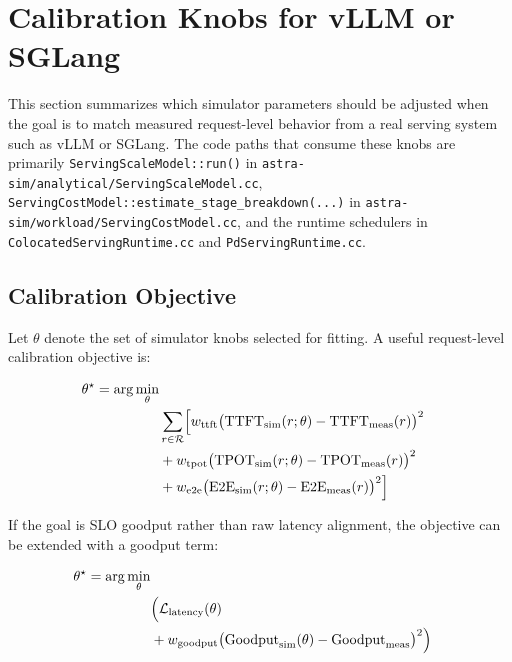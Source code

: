 \section{Calibration Knobs for vLLM or SGLang}

This section summarizes which simulator parameters should be adjusted when the
goal is to match measured request-level behavior from a real serving system such
as vLLM or SGLang. The code paths that consume these knobs are primarily
\texttt{ServingScaleModel::run()} in
\texttt{astra-sim/analytical/ServingScaleModel.cc},
\texttt{ServingCostModel::estimate\_stage\_breakdown(...)} in
\texttt{astra-sim/workload/ServingCostModel.cc}, and the runtime schedulers in
\texttt{ColocatedServingRuntime.cc} and \texttt{PdServingRuntime.cc}.

\subsection{Calibration Objective}

Let \(\theta\) denote the set of simulator knobs selected for fitting. A useful
request-level calibration objective is:

\begin{equation*}
\begin{aligned}
\theta^\star
= \arg\min_{\theta} \\
& \sum_{r \in \mathcal{R}}
\Bigl[
w_{\mathrm{ttft}}
\bigl(
\mathrm{TTFT}_{\mathrm{sim}}(r; \theta) -
\mathrm{TTFT}_{\mathrm{meas}}(r)
\bigr)^2 \\
& {}+ w_{\mathrm{tpot}}
\bigl(
\mathrm{TPOT}_{\mathrm{sim}}(r; \theta) -
\mathrm{TPOT}_{\mathrm{meas}}(r)
\bigr)^2 \\
& {}+ w_{\mathrm{e2e}}
\bigl(
\mathrm{E2E}_{\mathrm{sim}}(r; \theta) -
\mathrm{E2E}_{\mathrm{meas}}(r)
\bigr)^2
\Bigr]
\end{aligned}
\end{equation*}

If the goal is SLO goodput rather than raw latency alignment, the objective can
be extended with a goodput term:

\begin{equation*}
\begin{aligned}
\theta^\star
= \arg\min_{\theta} \\
& \Bigl(
\mathcal{L}_{\mathrm{latency}}(\theta) \\
& {}+ w_{\mathrm{goodput}}
\bigl(
\mathrm{Goodput}_{\mathrm{sim}}(\theta) -
\mathrm{Goodput}_{\mathrm{meas}}
\bigr)^2
\Bigr)
\end{aligned}
\end{equation*}

